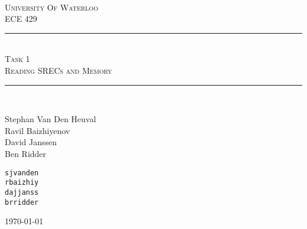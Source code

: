 \begin{titlepage}
\begin{center}
\vfill
\hfill
\\[2cm]
\textsc{\LARGE University Of Waterloo}
\\[1cm]
\textsc{\LARGE ECE 429}
\\[2cm]

\hrule
\hfill
\\[0.5cm]
\textsc{\huge Task 1}
\\[0.5cm]
\textsc{\huge Reading SRECs and Memory}
\\[0.5cm]
\hrule
\hfill
\\[1cm]

\begin{minipage}{0.4\textwidth}
\begin{flushleft} \large
Stephan Van Den Heuval \\
Ravil Baizhiyenov \\
David Janssen \\
Ben Ridder
\end{flushleft}
\end{minipage}
\begin{minipage}{0.4\textwidth}
\begin{flushright} \large
\texttt{sjvanden} \\
\texttt{rbaizhiy} \\
\texttt{dajjanss} \\
\texttt{brridder} 
\end{flushright}
\end{minipage}


\vfill

{\large \today}
\end{center}
\end{titlepage}
